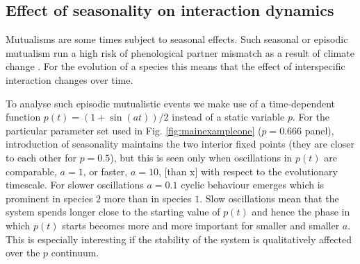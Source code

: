 \documentclass[12pt]{article}
\begin{document}
\subsection{Effect of seasonality on interaction dynamics}

Mutualisms are some times subject to seasonal effects.  Such seasonal or episodic mutualism run a high risk of phenological partner mismatch as a result of climate change \citep{rafferty:Oikos:2015}. For the evolution of a species this means that the effect of interspecific interaction changes over time.

To analyse such episodic mutualistic events we make use of a time-dependent function $p(t) = (1 + \sin(a t))/2 $ instead of a static variable $p$. For the particular parameter set used in Fig. \ref{fig:mainexampleone} ($p=0.666$ panel), introduction of seasonality maintains the two interior fixed points (they are closer to each other for $p = 0.5$), but this is seen only when oscillations in $p(t)$ are comparable, $a=1$, or faster, $a=10$, [than x] with respect to the evolutionary timescale. For slower oscillations $a=0.1$ cyclic behaviour emerges which is prominent in species $2$ more than in species $1$. Slow oscillations mean that the system spends longer close to the starting value of $p(t)$ and hence the phase in which $p(t)$ starts becomes more and more important for smaller and smaller $a$. This is especially interesting if the stability of the system is qualitatively affected over the $p$ continuum.
\end{document}
